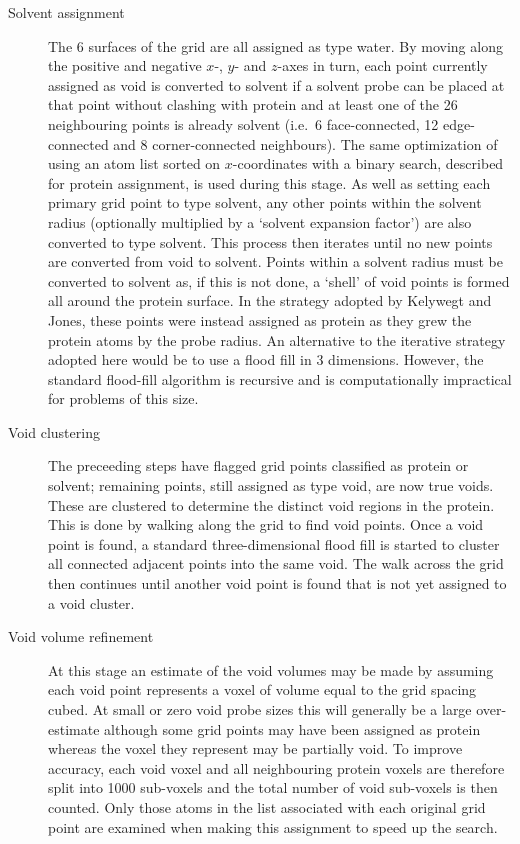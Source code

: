 \documentclass{article}
\let\shortcite\cite
\begin{document}
\begin{description}
\item[Solvent assignment] The 6 surfaces of the grid are all assigned
as type water. By moving along the positive and negative $x$-, $y$-
and $z$-axes in turn, each point currently assigned as void is
converted to solvent if a solvent probe can be placed at that point
without clashing with protein and at least one of the 26 neighbouring
points is already solvent (i.e.\ 6 face-connected, 12 edge-connected
and 8 corner-connected neighbours). The same optimization of using an
atom list sorted on $x$-coordinates with a binary search, described
for protein assignment, is used during this stage. As well as setting
each primary grid point to type solvent, any other points within the
solvent radius (optionally multiplied by a `solvent expansion factor')
are also converted to type solvent. This process then iterates until
no new points are converted from void to solvent.  Points within a
solvent radius must be converted to solvent as, if this is not done, a
`shell' of void points is formed all around the protein surface. In
the strategy adopted by Kelywegt and Jones\shortcite{kleywegt:voidoo},
these points were instead assigned as protein as they grew the protein
atoms by the probe radius. An alternative to the iterative strategy
adopted here would be to use a flood fill in 3 dimensions. However,
the standard flood-fill algorithm is recursive and is computationally
impractical for problems of this size.

\item[Void clustering] The preceeding steps have flagged grid points
classified as protein or solvent; remaining points, still assigned as
type void, are now true voids. These are clustered to determine the
distinct void regions in the protein. This is done by walking along
the grid to find void points. Once a void point is found, a standard
three-dimensional flood fill is started to cluster all connected
adjacent points into the same void. The walk across the grid then
continues until another void point is found that is not yet assigned
to a void cluster.

\item[Void volume refinement] At this stage an estimate of the void
volumes may be made by assuming each void point represents a voxel of
volume equal to the grid spacing cubed. At small or zero void probe
sizes this will generally be a large over-estimate although some grid
points may have been assigned as protein whereas the voxel they
represent may be partially void. To improve accuracy, each void voxel
and all neighbouring protein voxels are therefore split into 1000
sub-voxels and the total number of void sub-voxels is then
counted. Only those atoms in the list associated with each original
grid point are examined when making this assignment to speed up the
search. 
\end{description}
\end{document}
